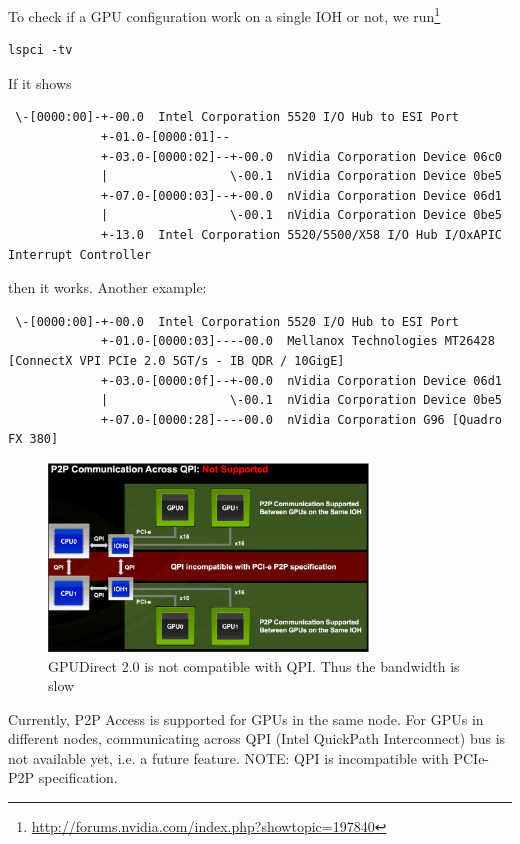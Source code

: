 To check if a GPU configuration work on a single IOH or not, we
run\footnote{\url{http://forums.nvidia.com/index.php?showtopic=197840}}
\begin{verbatim}
lspci -tv
\end{verbatim}
If it shows
\begin{lstlisting}
 \-[0000:00]-+-00.0  Intel Corporation 5520 I/O Hub to ESI Port
             +-01.0-[0000:01]--
             +-03.0-[0000:02]--+-00.0  nVidia Corporation Device 06c0
             |                 \-00.1  nVidia Corporation Device 0be5
             +-07.0-[0000:03]--+-00.0  nVidia Corporation Device 06d1
             |                 \-00.1  nVidia Corporation Device 0be5
             +-13.0  Intel Corporation 5520/5500/X58 I/O Hub I/OxAPIC Interrupt Controller

\end{lstlisting}
then it works. Another example:
\begin{lstlisting}
 \-[0000:00]-+-00.0  Intel Corporation 5520 I/O Hub to ESI Port
             +-01.0-[0000:03]----00.0  Mellanox Technologies MT26428 [ConnectX VPI PCIe 2.0 5GT/s - IB QDR / 10GigE]
             +-03.0-[0000:0f]--+-00.0  nVidia Corporation Device 06d1
             |                 \-00.1  nVidia Corporation Device 0be5
             +-07.0-[0000:28]----00.0  nVidia Corporation G96 [Quadro FX 380]

\end{lstlisting}


\begin{figure}[hbt]
  \centerline{\includegraphics[height=5cm,
    angle=0]{./images/IOH_across.eps}}
\caption{GPUDirect 2.0 is not compatible with QPI. Thus the bandwidth is slow}
\label{fig:IOH_P2P}
\end{figure}

Currently, P2P Access is supported for GPUs in the same node. For GPUs in
different nodes, communicating across QPI (Intel QuickPath Interconnect) bus is
not available yet, i.e. a future feature. NOTE: QPI is incompatible with PCIe-
P2P specification.


